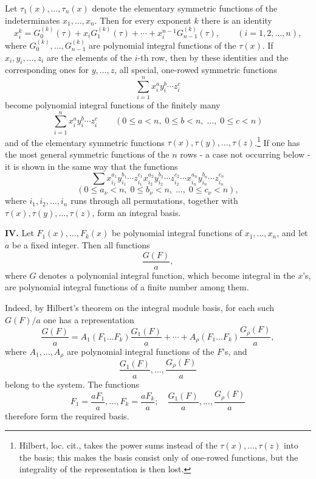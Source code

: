 \documentclass[11pt]{article}
\begin{document}
Let \(\tau_1(x),\ldots,\tau_n(x)\) denote the elementary symmetric functions of the indeterminates \(x_1,\ldots,x_n\). Then for every exponent \(k\) there is an identity
\[
        x_i^k = G_0^{(k)}(\tau)+x_iG_1^{(k)}(\tau)+\cdots+x_i^{n-1}G_{n-1}^{(k)}(\tau),
        \qquad (i=1,2,\ldots,n),
\]
where \(G_0^{(k)},\ldots,G_{n-1}^{(k)}\) are polynomial integral functions of the \(\tau(x)\). If \(x_i,y_i,\ldots,z_i\) are the elements of the \(i\)-th row, then by these identities and the corresponding ones for \(y,\ldots,z\), all special, one-rowed symmetric functions
\[
        \sum_{i=1}^n x_i^{a}y_i^{b}\cdots z_i^{c}
\]
become polynomial integral functions of the finitely many
\[
        \sum_{i=1}^n x_i^{a}y_i^{b}\cdots z_i^{c}
        \qquad
        (0\le a<n,\;0\le b<n,\;\ldots,\;0\le c<n)
\]
and of the elementary symmetric functions \(\tau(x),\tau(y),\ldots,\tau(z)\).\footnote{Hilbert, loc. cit., takes the power sums instead of the \(\tau(x),\ldots,\tau(z)\) into the basis; this makes the basis consist only of one-rowed functions, but the integrality of the representation is then lost.}
If one has the most general symmetric functions of the \(n\) rows - a case not occurring below - it is shown in the same way that the functions
\[
        \sum x_{i_1}^{a_1}y_{i_1}^{b_1}\cdots z_{i_1}^{c_1}
              x_{i_2}^{a_2}y_{i_2}^{b_2}\cdots z_{i_2}^{c_2}
              \cdots
              x_{i_n}^{a_n}y_{i_n}^{b_n}\cdots z_{i_n}^{c_n}
\]
\[
        (0\le a_\nu<n,\;0\le b_\nu<n,\;\ldots,\;0\le c_\nu<n),
\]
where \(i_1,i_2,\ldots,i_n\) runs through all permutations, together with \(\tau(x),\tau(y),\ldots,\tau(z)\), form an integral basis.

\textbf{IV.} Let \(F_1(x),\ldots,F_k(x)\) be polynomial integral functions of \(x_1,\ldots,x_n\), and let \(a\) be a fixed integer. Then all functions
\[
        \frac{G(F)}{a},
\]
where \(G\) denotes a polynomial integral function, which become integral in the \(x\)'s, are polynomial integral functions of a finite number among them.

Indeed, by Hilbert's theorem on the integral module basis, for each such \(G(F)/a\) one has a representation
\[
 \frac{G(F)}{a}
 =
 A_1(F_1\ldots F_k)\frac{G_1(F)}{a}
 +\cdots+
 A_\rho(F_1\ldots F_k)\frac{G_\rho(F)}{a},
\]
where \(A_1,\ldots,A_\rho\) are polynomial integral functions of the \(F\)'s, and
\[
        \frac{G_1(F)}{a},\ldots,\frac{G_\rho(F)}{a}
\]
belong to the system. The functions
\[
        F_1=\frac{aF_1}{a},\ldots,F_k=\frac{aF_k}{a};
        \quad
        \frac{G_1(F)}{a},\ldots,\frac{G_\rho(F)}{a}
\]
therefore form the required basis.
\end{document}
